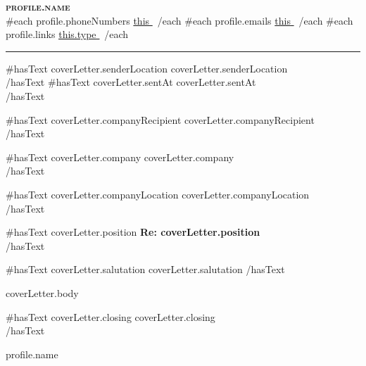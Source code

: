 \documentclass[a4paper,11pt]{letter}
\begin{document}
\begin{center}
  \textbf{\Huge\scshape {{profile.name}} } \\ \vspace{1pt}
  {{#each profile.phoneNumbers}} \small{\underline{ {{this}} }}\, {{/each}}
  {{#each profile.emails}} \small{\underline{ {{this}} }}\, {{/each}}
  {{#each profile.links}} \small{\href{ {{this.url}} }{\underline{ {{this.type}} }}}\, {{/each}}
\end{center}

\rule{\textwidth}{0.4pt}
\vspace{10pt}

\setlength{\lettercontentmargin}{0.4in}
\addtolength{\leftmargin}{\lettercontentmargin}
\addtolength{\rightmargin}{\lettercontentmargin}
\begin{adjustwidth}{}{}

\begin{flushright}
  {{#hasText coverLetter.senderLocation}}
    {{coverLetter.senderLocation}}\\
  {{/hasText}}
  {{#hasText coverLetter.sentAt}}
    \vspace{12pt}
    {{coverLetter.sentAt}}\\
  {{/hasText}}
\end{flushright}

\vspace{20pt}

{{#hasText coverLetter.companyRecipient}}
  {{coverLetter.companyRecipient}}\\
{{/hasText}}

{{#hasText coverLetter.company}}
  {{coverLetter.company}}\\
{{/hasText}}

{{#hasText coverLetter.companyLocation}}
  {{coverLetter.companyLocation}}\\
{{/hasText}}

\vspace{20pt}
{{#hasText coverLetter.position}}
  \textbf{Re: {{coverLetter.position}} }\\
{{/hasText}}

\vspace{20pt}
{{#hasText coverLetter.salutation}}
  {{coverLetter.salutation}}
{{/hasText}}

\vspace{12pt}
{{{coverLetter.body}}}

\vspace{20pt}
{{#hasText coverLetter.closing}}
  {{coverLetter.closing}}\\
{{/hasText}}

\vspace{12pt}
{{profile.name}}\\

\end{adjustwidth}
\end{document}
